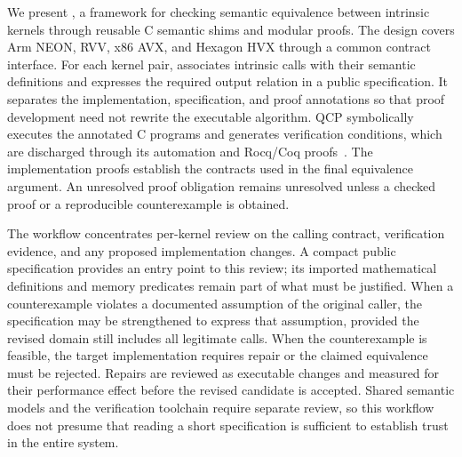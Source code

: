 We present \tool, a framework for checking semantic equivalence between intrinsic kernels through reusable C semantic shims and modular proofs. The design covers Arm NEON, RVV, x86 AVX, and Hexagon HVX through a common contract interface.  For each kernel pair, \tool associates intrinsic calls with their semantic definitions and expresses the required output relation in a public specification. It separates the implementation, specification, and proof annotations so that proof development need not rewrite the executable algorithm. QCP symbolically executes the annotated C programs and generates verification conditions, which are discharged through its automation and Rocq/Coq proofs~\cite{qcp}. The implementation proofs establish the contracts used in the final equivalence argument. An unresolved proof obligation remains unresolved unless a checked proof or a reproducible counterexample is obtained.

The workflow concentrates per-kernel review on the calling contract, verification evidence, and any proposed implementation changes. A compact public specification provides an entry point to this review; its imported mathematical definitions and memory predicates remain part of what must be justified. When a counterexample violates a documented assumption of the original caller, the specification may be strengthened to express that assumption, provided the revised domain still includes all legitimate calls. When the counterexample is feasible, the target implementation requires repair or the claimed equivalence must be rejected. Repairs are reviewed as executable changes and measured for their performance effect before the revised candidate is accepted. Shared semantic models and the verification toolchain require separate review, so this workflow does not presume that reading a short specification is sufficient to establish trust in the entire system.

